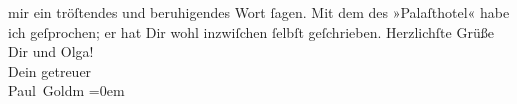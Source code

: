 \begin{ledgroupsized}[t]{13cm}
               mir ein tröſtendes und beruhigendes Wort ſagen. Mit dem \label{K_L03361-3v}\label{K_L03361-3h} des »Palaſthotel« habe ich geſprochen; er hat Dir wohl
               inzwiſchen ſelbſt geſchrieben.\pend
           \pstart
           Herzlichſte Grüße Dir und Olga! {\\[\baselineskip]}Dein
               getreuer {\\[\baselineskip]}\spacefill\mbox{Paul Goldm}\pend
           \leftskip=0em{}
         
         \endnumbering{}\end{ledgroupsized}\begin{anhang}\end{anhang}\newcommand{\dateiname}{L03361}\newcommand{\titel}{Paul Goldmann an Arthur Schnitzler, 27. 1. [1903]}\newcommand{\editorInnen}{Martin Anton Müller und Laura Untner}
      
